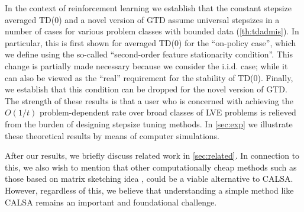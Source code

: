 \begin{enumerate}[topsep=0pt,itemsep=1pt,wide, labelwidth=!, labelindent=0pt,label=\emph{\arabic*}.]
In the context of reinforcement learning we establish that the constant stepsize averaged TD($0$) 
and a novel version of GTD assume universal stepsizes in a number of cases  
for various problem classes with bounded data (\cref{th:tdadmis}).
In particular, this is first shown for averaged TD($0$) for the ``on-policy case'', which we define
using the so-called ``second-order feature stationarity condition''. This change is partially made necessary because we consider the i.i.d. case; while it can also be viewed as the ``real'' requirement
for the stability of TD(0). 
Finally, we establish that this condition can be dropped for the novel version of GTD. The strength of these results is that a user 
who is concerned with achieving the $O(1/t)$ problem-dependent rate over broad classes of LVE problems
is relieved from the burden of designing stepsize tuning methods.
In \cref{sec:exp} we illustrate these theoretical results by means of computer simulations.
\end{enumerate}%
After our results, we briefly discuss related work in \cref{sec:related}.
In connection to this, we also wish to mention
that other computationally cheap methods such as those based on matrix sketching idea \cite{woodruff2014sketching}, could be a viable alternative to  CALSA. 
However, regardless of this, we believe that understanding a simple method like CALSA remains an important and foundational challenge.


